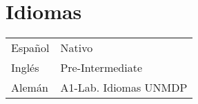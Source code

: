 \documentclass[a4paper,10pt]{article}
\begin{document}
\begin{adjustbox}{valign=t}
\begin{minipage}{0.34\textwidth}
\section*{Idiomas}
\begin{tabular}{ll}
	Español 	&  Nativo \\
	Inglés 		& Pre-Intermediate\\
	Alemán      & A1-Lab. Idiomas UNMDP
 \end{tabular}
\end{minipage}
\end{adjustbox}
\hfill
\begin{adjustbox}{valign=t}
\begin{minipage}{0.001\textwidth} %
\MyVerticalRule  %
\end{minipage}
\end{adjustbox}
\hfill
\end{document}
